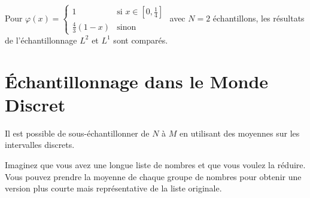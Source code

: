 \documentclass[12pt]{article}
\begin{document}
Pour $\varphi(x) = \begin{cases} 
1 & \text{si } x \in [0, \frac{1}{4}] \\
\frac{4}{3}(1-x) & \text{sinon}
\end{cases}$ avec $N = 2$ échantillons, les résultats de l'échantillonnage $L^2$ et $L^1$ sont comparés.

\newpage

\section{Échantillonnage dans le Monde Discret}

Il est possible de sous-échantillonner de $N$ à $M$ en utilisant des moyennes sur les intervalles discrets.


\begin{tcolorbox}[title={Vulgarisation simple}]
Imaginez que vous avez une longue liste de nombres et que vous voulez la réduire. Vous pouvez prendre la moyenne de chaque groupe de nombres pour obtenir une version plus courte mais représentative de la liste originale.
\end{tcolorbox}
\end{document}
